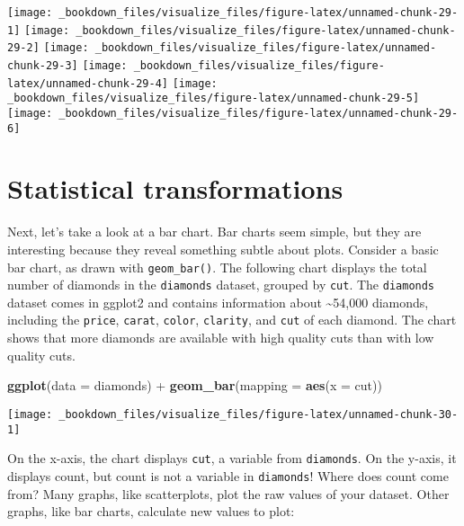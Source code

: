 \documentclass[]{book}
\newenvironment{Shaded}{\begin{snugshade}}{\end{snugshade}}
\newcommand{\KeywordTok}[1]{\textcolor[rgb]{0.13,0.29,0.53}{\textbf{{#1}}}}
\newcommand{\DataTypeTok}[1]{\textcolor[rgb]{0.13,0.29,0.53}{{#1}}}
\newcommand{\StringTok}[1]{\textcolor[rgb]{0.31,0.60,0.02}{{#1}}}
\newcommand{\NormalTok}[1]{{#1}}
\begin{document}
\begin{enumerate}
  \texttt{[image: \_bookdown\_files/visualize\_files/figure-latex/unnamed-chunk-29-1]}
  \texttt{[image: \_bookdown\_files/visualize\_files/figure-latex/unnamed-chunk-29-2]}
  \texttt{[image: \_bookdown\_files/visualize\_files/figure-latex/unnamed-chunk-29-3]}
  \texttt{[image: \_bookdown\_files/visualize\_files/figure-latex/unnamed-chunk-29-4]}
  \texttt{[image: \_bookdown\_files/visualize\_files/figure-latex/unnamed-chunk-29-5]}
  \texttt{[image: \_bookdown\_files/visualize\_files/figure-latex/unnamed-chunk-29-6]}
\end{enumerate}

\section{Statistical transformations}\label{statistical-transformations}

Next, let's take a look at a bar chart. Bar charts seem simple, but they
are interesting because they reveal something subtle about plots.
Consider a basic bar chart, as drawn with \texttt{geom\_bar()}. The
following chart displays the total number of diamonds in the
\texttt{diamonds} dataset, grouped by \texttt{cut}. The
\texttt{diamonds} dataset comes in ggplot2 and contains information
about \textasciitilde{}54,000 diamonds, including the \texttt{price},
\texttt{carat}, \texttt{color}, \texttt{clarity}, and \texttt{cut} of
each diamond. The chart shows that more diamonds are available with high
quality cuts than with low quality cuts.

\begin{Shaded}
\begin{Highlighting}[]
\KeywordTok{ggplot}\NormalTok{(}\DataTypeTok{data =} \NormalTok{diamonds) +}\StringTok{ }
\StringTok{  }\KeywordTok{geom_bar}\NormalTok{(}\DataTypeTok{mapping =} \KeywordTok{aes}\NormalTok{(}\DataTypeTok{x =} \NormalTok{cut))}
\end{Highlighting}
\end{Shaded}

\begin{center}\texttt{[image: \_bookdown\_files/visualize\_files/figure-latex/unnamed-chunk-30-1]} \end{center}

On the x-axis, the chart displays \texttt{cut}, a variable from
\texttt{diamonds}. On the y-axis, it displays count, but count is not a
variable in \texttt{diamonds}! Where does count come from? Many graphs,
like scatterplots, plot the raw values of your dataset. Other graphs,
like bar charts, calculate new values to plot:
\end{document}
